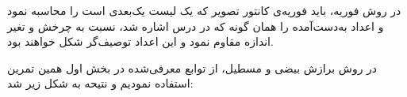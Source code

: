 \documentclass[12pt,a4paper]{article}
\theoremstyle{definition}
\theoremstyle{theorem}
\theoremstyle{definition}
\begin{document}
در روش فوریه، باید فوریه‌ی کانتور تصویر که یک لیست یک‌بعدی است را محاسبه نمود و اعداد به‌دست‌آمده را همان گونه که در درس اشاره شد، نسبت به چرخش و تغیر اندازه مقاوم نمود و این اعداد توصیف‌گر شکل خواهند بود.

در روش برازش بیضی و مسطیل، از توابع معرفی‌شده در بخش اول همین تمرین استفاده نمودیم و نتیحه به شکل زیر شد: 

\begin{center}
\end{center}
 
\end{document}
